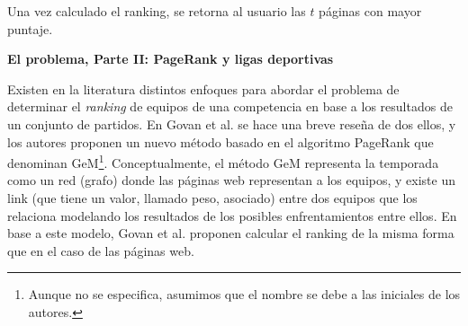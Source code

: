 \documentclass[11pt, a4paper]{article}
\begin{document}
Una vez calculado el ranking, se retorna al usuario las $t$ p\'aginas con mayor puntaje.

\vskip 5pt
\noindent\textbf{El problema, Parte II: PageRank y ligas deportivas}
\vskip 5pt

Existen en la literatura distintos enfoques para abordar el problema de determinar el \emph{ranking} de equipos de una competencia en
base a los resultados de un conjunto de partidos. En Govan et al. \cite{Govan2008} se hace una breve rese\~na de dos ellos, y los autores
proponen un nuevo m\'etodo basado en el algoritmo PageRank que denominan GeM\footnote{Aunque no se especifica, asumimos que el nombre se
debe a las iniciales de los autores.}. Conceptualmente, el m\'etodo GeM representa la temporada como un red (grafo) donde las p\'aginas web
representan a los equipos, y existe un link (que tiene un valor, llamado peso, asociado) entre dos equipos que los relaciona modelando los resultados de los posibles
enfrentamientos entre ellos. En base a este modelo, Govan et al. \cite{Govan2008} proponen calcular el ranking de la misma forma que en el 
caso de las p\'aginas web.
\end{document}
